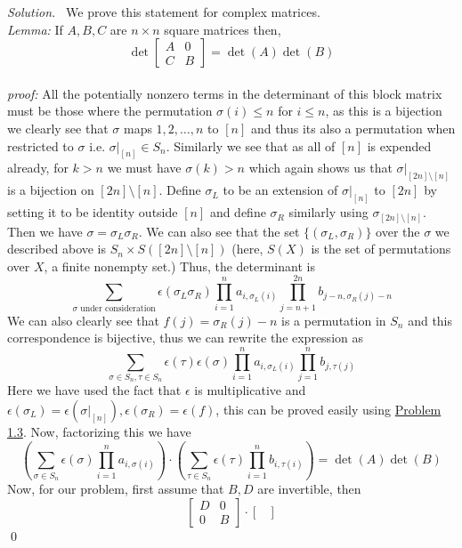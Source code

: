 \documentclass[12pt,a4paper]{article}
\newenvironment{solution}{%
  \par\noindent\textit{Solution.}\ }{\qed}
\theoremstyle{problemstyle}
\def\sgn{\epsilon}
\begin{document}
\begin{solution}
    We prove this statement for complex matrices.
    \\ \textit{Lemma: } If $A,B,C$ are $n\times n$ square matrices then,
    $$\det\begin{bmatrix}
    A & 0 \\ C & B
    \end{bmatrix}=\det(A)\det(B)$$ 
    \\ \textit{proof: } All the potentially nonzero terms in the determinant of this block matrix must be those where the permutation $\sigma(i)\leq n$ for $i\leq n$, as this is a bijection we clearly see that $\sigma$ maps $1,2,\ldots,n$ to $[n]$ and thus its also a permutation when restricted to $\sigma$ i.e. $\sigma|_{[n]}\in S_n$. 
    Similarly we see that as all of $[n]$ is expended already, for $k>n$ we must have $\sigma(k)>n$ which again shows us that $\sigma|_{[2n]\setminus[n]}$ is a bijection on $[2n]\setminus[n]$. 
    Define $\sigma_{L}$ to be an extension of $\sigma|_{[n]}$ to $[2n]$ by setting it to be identity outside $[n]$ and define $\sigma_R$ similarly using $\sigma_{[2n]\setminus[n]}$. 
    Then we have $\sigma=\sigma_L\sigma_R$. 
    We can also see that the set $\{(\sigma_L,\sigma_R)\}$ over the $\sigma$ we described above is $S_n\times S([2n]\setminus[n])$ (here, $S(X)$ is the set of permutations over $X$, a finite nonempty set.) 
    Thus, the determinant is
    $$\sum_{\sigma\text{ under consideration}}\sgn(\sigma_L\sigma_R)\prod_{i=1}^na_{i,\sigma_L(i)}\prod_{j=n+1}^{2n}b_{j-n,\sigma_R(j)-n}
    $$
    We can also clearly see that $f(j)=\sigma_R(j)-n$ is a permutation in $S_n$ and this correspondence is bijective, thus we can rewrite the expression as
    $$\sum_{\sigma\in S_n,\tau\in S_n}\sgn(\tau)\sgn(\sigma)\prod_{i=1}^na_{i,\sigma_L(i)}\prod_{j=1}^{n}b_{j,\tau(j)}$$ 
    Here we have used the fact that $\epsilon$ is multiplicative and $\epsilon(\sigma_L)=\epsilon(\sigma|_{[n]}),\epsilon(\sigma_R)=\epsilon(f)$, this can be proved easily using \hyperref[prob:1.3]{Problem 1.3}. 
    Now, factorizing this we have
    $$\left(\sum_{\sigma\in S_n}\epsilon(\sigma)\prod_{i=1}^na_{i,\sigma(i)}\right)\cdot\left(\sum_{\tau\in S_n}\epsilon(\tau)\prod_{i=1}^nb_{i,\tau(i)}\right)=\det(A)\det(B)$$
    Now, for our problem, first assume that $B,D$ are invertible, then
    $$\begin{bmatrix}
    D & 0 \\ 0 & B
    \end{bmatrix}\cdot\begin{bmatrix}

\end{bmatrix}$$
\end{solution}
\end{document}
